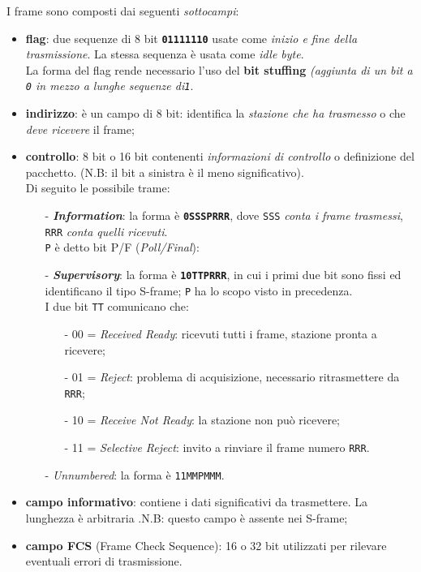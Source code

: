 \documentclass[a4paper,11pt]{article}
\def\code#1{\texttt{#1}}
\def\italic#1{\textit{#1}}
\begin{document}
I frame sono composti dai seguenti \textit{sottocampi}:
\begin{itemize}
	\item \textbf{flag}: due sequenze di 8 bit \textbf{\code{01111110}} usate come \textit{inizio e fine della trasmissione}. La stessa sequenza è usata come \textit{idle byte}.
	\\La forma del flag rende necessario l'uso del \textbf{bit stuffing} \textit{(aggiunta di un bit a \code{0} in mezzo a lunghe sequenze di\code{1}}.
	\item \textbf{indirizzo}: è un campo di 8 bit: identifica la \textit{stazione che ha trasmesso }o che \textit{deve ricevere }il frame;
	\item \textbf{controllo}: 8 bit o 16 bit contenenti \textit{informazioni di controllo }o definizione del pacchetto. (N.B: il bit a sinistra è il meno significativo). \\Di seguito le possibile trame:
	\begin{itemize}
		\item[-]\italic{\textbf{Information}}: la forma è \code{\textbf{0SSSPRRR}}, dove \code{SSS} \textit{conta i frame trasmessi}, \code{RRR} \textit{conta quelli ricevuti}.
		\\\code{P} è detto bit P/F (\italic{Poll/Final}):
		\item[-]\italic{\textbf{Supervisory}}: la forma è \code{\textbf{10TTPRRR}}, in cui i primi due bit sono fissi ed identificano il tipo S-frame; \code{P} ha lo scopo visto in precedenza.
		\\I due bit \code{TT} comunicano che:
		\begin{itemize}
			\item[- 00]= \italic{Received Ready}: ricevuti tutti i frame, stazione pronta a ricevere;
			\item[- 01]= \italic{Reject}: problema di acquisizione, necessario ritrasmettere da \code{RRR};
			\item[- 10]= \italic{Receive Not Ready}: la stazione non può ricevere;
			\item[- 11]= \italic{Selective Reject}: invito a rinviare il frame numero \code{RRR}.
		\end{itemize}
		
		\item[-]\italic{Unnumbered}: la forma è \code{11MMPMMM}.		 
	\end{itemize}
	\item \textbf{campo informativo}: contiene i dati significativi da trasmettere. La lunghezza è arbitraria .N.B: questo campo è assente nei S-frame;
	\item \textbf{campo FCS} (Frame Check Sequence): 16 o 32 bit utilizzati per rilevare eventuali errori di trasmissione.
\end{itemize}
\end{document}
